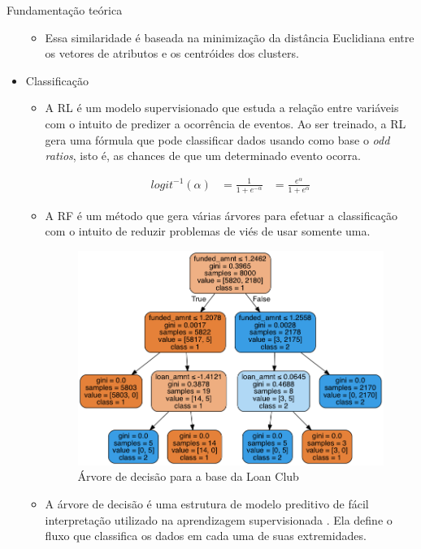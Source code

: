 \documentclass[final,hyperref={pdfpagelabels=false, brazil}]{beamer}
\let\olditem=\item%
\renewcommand{\item}{\olditem \justifying}%
\begin{document}
\begin{frame}[t]
\begin{columns}[t]
\begin{column}{.465\textwidth}
\begin{block}{Fundamenta\c c\~ao te\'orica}
\begin{itemize}
\begin{itemize}
\item Essa similaridade é baseada na minimização da distância Euclidiana entre os vetores de atributos e os centróides dos clusters.

\end{itemize}
\item Classificação
\begin{itemize}
\item A RL é um modelo supervisionado que estuda a relação entre variáveis com o intuito de predizer a ocorrência de eventos. Ao ser treinado, a RL gera uma fórmula que pode classificar dados usando como base o \emph{odd ratios}, isto é, as chances de que um determinado evento ocorra\cite{HASTIE}. 

\begin{equation}
  \label{eq:t}
  \begin{aligned}
    logit^{-1}(\alpha) &= \frac{1}{1+e^{-\alpha}} &= \frac{e^{\alpha}}{1+e^{\alpha}}
  \end{aligned}
\end{equation}

\end{itemize}

\begin{itemize}
\item A RF é um método que gera várias árvores para efetuar a classificação com o intuito de reduzir problemas de viés de usar somente uma. 

\begin{figure}
\caption{Árvore de decisão para a base da Loan Club}
\centering
\includegraphics[width=0.65\linewidth]{loan.png}

\end{figure}

\item A árvore de decisão é uma estrutura de modelo preditivo de fácil interpretação utilizado na aprendizagem supervisionada \cite{HASTIE}. Ela define o fluxo que classifica os dados em cada uma de suas extremidades.



\end{itemize}
\end{itemize}
\end{block}
\end{column}
\end{columns}
\end{frame}
\end{document}
